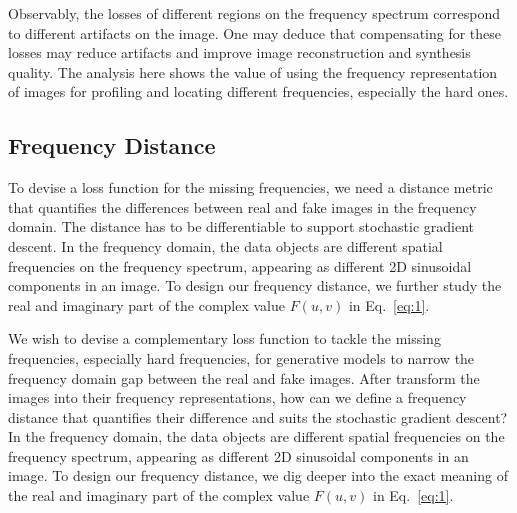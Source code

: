 \documentclass[10pt,twocolumn,letterpaper]{article}
\begin{document}
Observably, the losses of different regions on the frequency spectrum correspond to different artifacts on the image.
One may deduce that compensating for these losses may reduce artifacts and improve image reconstruction and synthesis quality.
The analysis here shows the value of using the frequency representation of images for profiling and locating different frequencies, especially the hard ones.





\subsection{Frequency Distance}
\label{sec:freqdist}

To devise a loss function for the missing frequencies, we need a distance metric that quantifies the differences between real and fake images in the frequency domain. The distance has to be differentiable to support stochastic gradient descent.
In the frequency domain, the data objects are different spatial frequencies on the frequency spectrum, appearing as different 2D sinusoidal components in an image.
To design our frequency distance, we further study the real and imaginary part of the complex value $F\left(u,v\right)$ in Eq.~\eqref{eq:1}.

We wish to devise a complementary loss function to tackle the missing frequencies, especially hard frequencies, for generative models to narrow the frequency domain gap between the real and fake images.
After transform the images into their frequency representations, how can we define a frequency distance that quantifies their difference and suits the stochastic gradient descent?
In the frequency domain, the data objects are different spatial frequencies on the frequency spectrum, appearing as different 2D sinusoidal components in an image.
To design our frequency distance, we dig deeper into the exact meaning of the real and imaginary part of the complex value $F\left(u,v\right)$ in Eq.~\eqref{eq:1}.
\fi 
\end{document}
